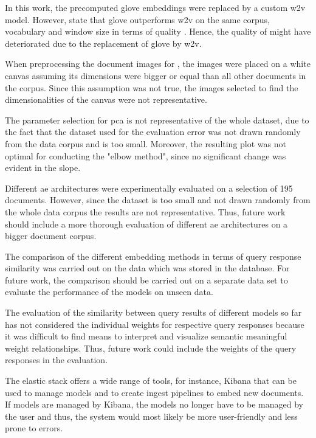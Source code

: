 In this work, the precomputed \ac{glove} embeddings were replaced by a custom \ac{w2v} model.
However, \citeauthor{glove2014} state that \acs{glove} outperforms \ac{w2v} on the same corpus, 
vocabulary and window size in terms of quality \cite{glove2014}.
Hence, the quality of \infersent{} might have deteriorated due to the replacement of \ac{glove} by \ac{w2v}.

When preprocessing the document images for \eigendocs{}, the images were placed on a white canvas assuming 
its dimensions were bigger or equal than all other documents in the corpus.
Since this assumption was not true, the images selected to find the dimensionalities of the canvas were not representative.

The parameter selection for \ac{pca} is not representative of the whole dataset, 
due to the fact that the dataset used for the evaluation error was not drawn randomly from the data corpus and is too small.
Moreover, the resulting plot was not optimal for conducting the "elbow method", since no significant change was evident in the slope.


Different \ac{ae} architectures were experimentally evaluated on a selection of 195 documents.
However, since the dataset is too small and not drawn randomly from the whole data corpus the results are not representative.
Thus, future work should include a more thorough evaluation of different \ac{ae} architectures on a bigger document corpus.

The comparison of the different embedding methods in terms of query response similarity was carried out on the data which was stored in the database.
For future work, the comparison should be carried out on a separate data set to evaluate the performance of the models on unseen data.

The evaluation of the similarity between query results of different models so far 
has not considered the individual weights for respective query responses
because it was difficult to find means 
to interpret and visualize semantic meaningful weight relationships.
Thus, future work could include the weights of the query responses in the evaluation.

The elastic stack offers a wide range of tools, for instance, Kibana that can be used to manage models and 
to create ingest pipelines to embed new documents.
If models are managed by Kibana, the models no longer have to be managed by the user and thus, 
the system would most likely be more user-friendly and less prone to errors.

